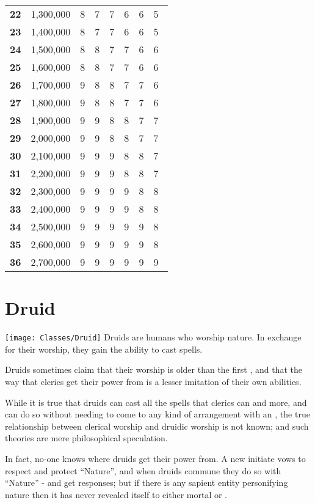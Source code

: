 \begin{multicols*}{2}
\begin {table}[H]
\begin{tabularx}{\columnwidth}{>{\bfseries}YcYYYYYY}
		22 & 1,300,000 & 8 & 7 & 7 & 6 & 6 & 5\\
		23 & 1,400,000 & 8 & 7 & 7 & 6 & 6 & 5\\
		24 & 1,500,000 & 8 & 8 & 7 & 7 & 6 & 6\\
		25 & 1,600,000 & 8 & 8 & 7 & 7 & 6 & 6\\
		26 & 1,700,000 & 9 & 8 & 8 & 7 & 7 & 6\\
		27 & 1,800,000 & 9 & 8 & 8 & 7 & 7 & 6\\
		28 & 1,900,000 & 9 & 9 & 8 & 8 & 7 & 7\\
		29 & 2,000,000 & 9 & 9 & 8 & 8 & 7 & 7\\
		30 & 2,100,000 & 9 & 9 & 9 & 8 & 8 & 7\\
		31 & 2,200,000 & 9 & 9 & 9 & 8 & 8 & 7\\
		32 & 2,300,000 & 9 & 9 & 9 & 9 & 8 & 8\\
		33 & 2,400,000 & 9 & 9 & 9 & 9 & 8 & 8\\
		34 & 2,500,000 & 9 & 9 & 9 & 9 & 9 & 8\\
		35 & 2,600,000 & 9 & 9 & 9 & 9 & 9 & 8\\
		36 & 2,700,000 & 9 & 9 & 9 & 9 & 9 & 9\
  \end {tabularx}
\end {table}

\section{Druid}\label{class:Druid}
\texttt{[image: Classes/Druid]}
Druids are humans who worship nature. In exchange for their worship, they gain the ability to cast spells.

Druids sometimes claim that their worship is older than the first , and that the way that clerics get their power from  is a lesser imitation of their own abilities.

While it is true that druids can cast all the spells that clerics can and more, and can do so without needing to come to any kind of arrangement with an , the true relationship between clerical worship and druidic worship is not known; and such theories are mere philosophical speculation.

In fact, no-one knows where druids get their power from. A new initiate vows to respect and protect “Nature”, and when druids commune they do so with “Nature” - and get responses; but if there is any sapient entity personifying nature then it has never revealed itself to either mortal or .


\end{multicols*}
